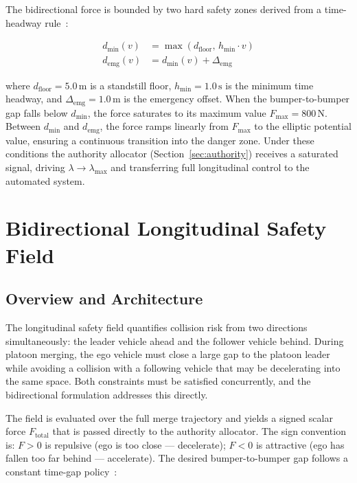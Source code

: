 \documentclass[12pt,a4paper,oneside]{report}
\begin{document}
The bidirectional force is bounded by two hard safety zones derived from a time-headway rule~\cite{wangDrivingSafetyField2016}:

\begin{align}
d_{\min}(v) &= \max\!\left(d_{\mathrm{floor}},\, h_{\min} \cdot v\right) \label{eq:min_safe} \\
d_{\mathrm{emg}}(v) &= d_{\min}(v) + \Delta_{\mathrm{emg}} \label{eq:emg_dist}
\end{align}

where $d_{\mathrm{floor}} = 5.0\,\mathrm{m}$ is a standstill floor, $h_{\min} = 1.0\,\mathrm{s}$ is the minimum time headway, and $\Delta_{\mathrm{emg}} = 1.0\,\mathrm{m}$ is the emergency offset. When the bumper-to-bumper gap falls below $d_{\min}$, the force saturates to its maximum value $F_{\max} = 800\,\mathrm{N}$. Between $d_{\min}$ and $d_{\mathrm{emg}}$, the force ramps linearly from $F_{\max}$ to the elliptic potential value, ensuring a continuous transition into the danger zone. Under these conditions the authority allocator (Section~\ref{sec:authority}) receives a saturated signal, driving $\lambda \to \lambda_{\max}$ and transferring full longitudinal control to the automated system.

\section{Bidirectional Longitudinal Safety Field}
\label{sec:longitudinal_field}

\subsection{Overview and Architecture}

The longitudinal safety field quantifies collision risk from two directions simultaneously: the leader vehicle ahead and the follower vehicle behind. During platoon merging, the ego vehicle must close a large gap to the platoon leader while avoiding a collision with a following vehicle that may be decelerating into the same space. Both constraints must be satisfied concurrently, and the bidirectional formulation addresses this directly.

The field is evaluated over the full merge trajectory and yields a signed scalar force $F_{\mathrm{total}}$ that is passed directly to the authority allocator. The sign convention is: $F > 0$ is repulsive (ego is too close — decelerate); $F < 0$ is attractive (ego has fallen too far behind — accelerate). The desired bumper-to-bumper gap follows a constant time-gap policy~\cite{rajamaniVehicleDynamicsControl2005}:
\end{document}
